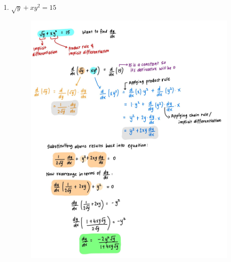 \documentclass{article}
\begin{document}
\begin{enumerate}
    \item $\sqrt{y} + xy^2 = 15$
    \begin{figure}[H]
        \centering
        \includegraphics[width=\linewidth]{Q3.jpg}
        \label{fig:Q3}
    \end{figure}
    

\end{enumerate}
\end{document}
